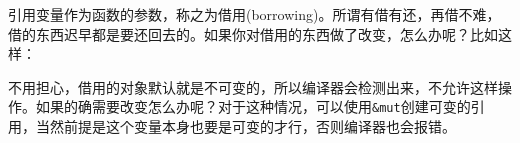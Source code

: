 \documentclass[12pt]{article}
\begin{document}
引用变量作为函数的参数，称之为借用(borrowing)。所谓有借有还，再借不难，借的东西迟早都是要还回去的。如果你对借用的东西做了改变，怎么办呢？比如这样：

\begin{Shaded}
\begin{Highlighting}[]
 \OperatorTok{|} \OperatorTok{:} \OperatorTok{\&}\NormalTok{) }\OperatorTok{\{}
   \OperatorTok{|}                \OperatorTok{{-}{-}{-}{-}{-}{-}{-}}\OperatorTok{:}\OperatorTok{:}\NormalTok{ \textasciigrave{}}\OperatorTok{\&} 
 \OperatorTok{|}     \NormalTok{)}\OperatorTok{;}
   \OperatorTok{|}     \OperatorTok{\^{}\^{}\^{}}\OperatorTok{\&}\OperatorTok{,}
\end{Highlighting}
\end{Shaded}

不用担心，借用的对象默认就是不可变的，所以编译器会检测出来，不允许这样操作。如果的确需要改变怎么办呢？对于这种情况，可以使用\texttt{\&mut}创建可变的引用，当然前提是这个变量本身也要是可变的才行，否则编译器也会报错。

\begin{Shaded}
\begin{Highlighting}[]
\OperatorTok{:} \OperatorTok{\&} \NormalTok{) }\OperatorTok{\{}
    \NormalTok{)}\OperatorTok{;}
    \NormalTok{(}\OperatorTok{,} \NormalTok{)}\OperatorTok{;}
\OperatorTok{\}}

\OperatorTok{\{}
     \OperatorTok{=} \PreprocessorTok{::}\NormalTok{)}\OperatorTok{;}
\OperatorTok{\&}\OperatorTok{;}
\OperatorTok{\}}
\end{Highlighting}
\end{Shaded}
\end{document}
